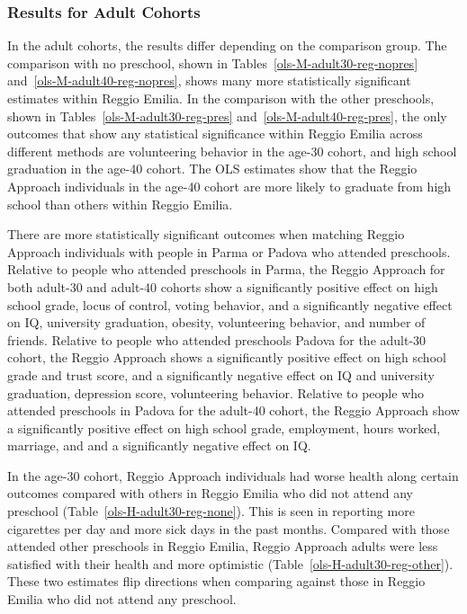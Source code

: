 \subsubsection{Results for Adult Cohorts}
In the adult cohorts, the results differ depending on the comparison group. The comparison with no preschool, shown in Tables~\ref{ols-M-adult30-reg-nopres} and~\ref{ols-M-adult40-reg-nopres}, shows many more statistically significant estimates within Reggio Emilia. In the comparison with the other preschools, shown in Tables~\ref{ols-M-adult30-reg-pres} and~\ref{ols-M-adult40-reg-pres}, the only outcomes that show any statistical significance within Reggio Emilia across different methods are volunteering behavior in the age-30 cohort, and high school graduation in the age-40 cohort. The OLS estimates show that the Reggio Approach individuals in the age-40 cohort are more likely to graduate from high school than others within Reggio Emilia.

There are more statistically significant outcomes when matching Reggio Approach individuals with people in Parma or Padova who attended preschools. Relative to people who attended preschools in Parma, the Reggio Approach for both adult-30 and adult-40 cohorts show a significantly positive effect on high school grade, locus of control, voting behavior, and a significantly negative effect on IQ, university graduation, obesity, volunteering behavior, and number of friends. Relative to people who attended preschools Padova for the adult-30 cohort, the Reggio Approach shows a significantly positive effect on high school grade and trust score, and a significantly negative effect on IQ and university graduation, depression score, volunteering behavior. Relative to people who attended preschools in Padova for the adult-40 cohort, the Reggio Approach show a significantly positive effect on high school grade, employment, hours worked, marriage, and  and a significantly negative effect on IQ.

In the age-30 cohort, Reggio Approach individuals had worse health along certain outcomes compared with others in Reggio Emilia who did not attend any preschool (Table~\ref{ols-H-adult30-reg-none}). This is seen in reporting more cigarettes per day and more sick days in the past months. Compared with those attended other preschools in Reggio Emilia, Reggio Approach adults were less satisfied with their health and more optimistic (Table~\ref{ols-H-adult30-reg-other}). These two estimates flip directions when comparing against those in Reggio Emilia who did not attend any preschool.

